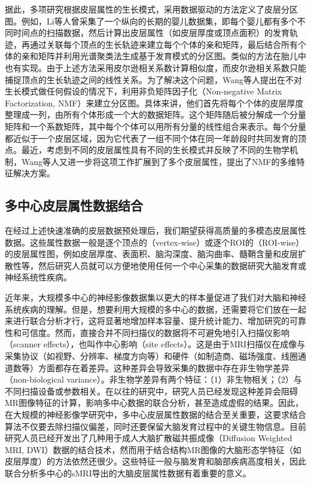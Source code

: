 据此，多项研究根据皮层属性的生长模式，采用数据驱动的方法定义了皮层分区图。例如，Li等人\cite{li2015parcellation}曾采集了一个纵向的长期的婴儿数据集，即每个婴儿都有多个不同时间点的扫描数据，然后计算出皮层属性（如皮层厚度或顶点面积）的发育轨迹，再通过关联每个顶点的生长轨迹来建立每个个体的亲和矩阵，最后结合所有个体的亲和矩阵并利用光谱聚类法生成基于发育模式的分区图。类似的方法在胎儿中也有实现\cite{xia2019fetal}。由于上述方法采用皮尔逊相关系数计算相似度，而皮尔逊相关系数只能捕捉顶点的生长轨迹之间的线性关系。为了解决这个问题，Wang等人\cite{wang2019developmental}提出在不对生长模式做任何假设的情况下，利用非负矩阵因子化（Non-negative Matrix Factorization, NMF）来建立分区图。具体来讲，他们首先将每个个体的皮层厚度整理成一列，由所有个体形成一个大的数据矩阵。这个矩阵随后被分解成一个分量矩阵和一个系数矩阵，其中每个个体可以用所有分量的线性组合来表示。每个分量都近似于一个皮层区域，因为它代表了一组不同个体在同一年龄段时共同发育的顶点。最近，考虑到不同的皮层属性具有不同的生长模式并反映了不同的生物学机制，Wang等人又进一步\cite{wang2019revealing}将这项工作扩展到了多个皮层属性，提出了NMF的多维特征解决方案。


\subsection{多中心皮层属性数据结合}\label{sec:绪论_多中心皮层属性数据结合}
在经过上述快速准确的皮层数据预处理后，我们期望获得高质量的多模态皮层属性数据。这些属性数据一般是逐个顶点的（vertex-wise）或逐个ROI的（ROI-wise）的皮层属性图，例如皮层厚度、表面积、脑沟深度、脑沟曲率、髓鞘含量和皮层扩散性等，然后研究人员就可以方便地使用任何一个中心采集的数据研究大脑发育或神经系统性疾病。

近年来，大规模多中心的神经影像数据集以更大的样本量促进了我们对大脑和神经系统疾病的理解\cite{howell2019unc,li2019computational,glasser2013minimal}。但是，想要利用大规模的多中心的数据，还需要将它们放在一起来进行联合分析才行，这将显著地增加样本容量、提升统计能力、增加研究的可靠性和可信度。然而，直接合并不同扫描仪的数据将不可避免地引入扫描仪影响（scanner effects），也叫作中心影响（site effects）。这是由于MRI扫描仪在成像与采集协议（如视野、分辨率、梯度方向等）和硬件（如制造商、磁场强度、线圈通道数等）方面都存在着差异。这种差异会导致采集的数据中存在非生物学差异（non-biological variance）。非生物学差异有两个特征：（1）非生物相关；（2）与不同扫描设备或参数相关。在以往的研究中，研究人员已经发现这种差异会阻碍MR图像特征的计算\cite{han2006reliability,takao2011effect}，影响多中心数据的联合分析\cite{fortin2018harmonization}，甚至造成虚假的结果\cite{rao2017predictive}。因此，在大规模的神经影像学研究中，多中心皮层属性数据的结合至关重要，这要求结合算法不仅要去除扫描仪偏差，同时还要保留大脑发育过程中的关键生物信息。目前研究人员已经开发出了几种用于成人大脑扩散磁共振成像（Diffusion Weighted MRI, DWI）数据的结合技术\cite{huynh2019multi,karayumak2018harmonizing,karayumak2019retrospective}，然而用于结合结构MR图像的大脑形态学特征（如皮层厚度）的方法依然还很少。这些特征一般与脑发育和脑部疾病高度相关，因此联合分析多中心的sMRI导出的大脑皮层属性数据有着重要的意义。

